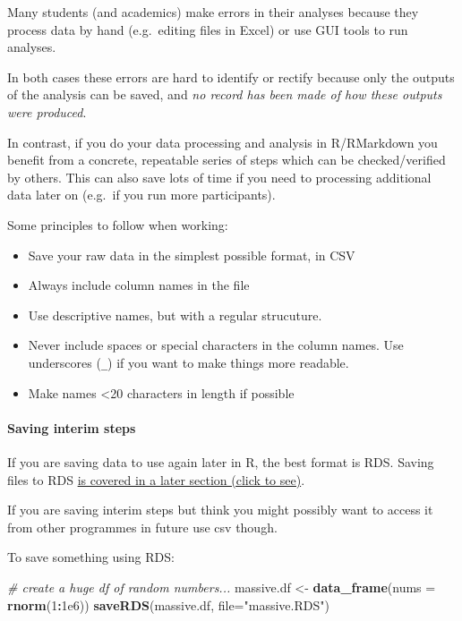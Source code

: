 \documentclass[]{article}
\newenvironment{Shaded}{\begin{snugshade}}{\end{snugshade}}
\newcommand{\KeywordTok}[1]{\textcolor[rgb]{0.13,0.29,0.53}{\textbf{#1}}}
\newcommand{\DataTypeTok}[1]{\textcolor[rgb]{0.13,0.29,0.53}{#1}}
\newcommand{\DecValTok}[1]{\textcolor[rgb]{0.00,0.00,0.81}{#1}}
\newcommand{\FloatTok}[1]{\textcolor[rgb]{0.00,0.00,0.81}{#1}}
\newcommand{\StringTok}[1]{\textcolor[rgb]{0.31,0.60,0.02}{#1}}
\newcommand{\CommentTok}[1]{\textcolor[rgb]{0.56,0.35,0.01}{\textit{#1}}}
\newcommand{\OperatorTok}[1]{\textcolor[rgb]{0.81,0.36,0.00}{\textbf{#1}}}
\newcommand{\NormalTok}[1]{#1}
\let\oldparagraph\paragraph
\renewcommand{\paragraph}[1]{\oldparagraph{#1}\mbox{}}
\theoremstyle{definition}
\theoremstyle{definition}
\theoremstyle{definition}
\theoremstyle{remark}
\begin{document}
Many students (and academics) make errors in their analyses because they
process data by hand (e.g.~editing files in Excel) or use GUI tools to
run analyses.

In both cases these errors are hard to identify or rectify because only
the outputs of the analysis can be saved, and \emph{no record has been
made of how these outputs were produced}.

In contrast, if you do your data processing and analysis in R/RMarkdown
you benefit from a concrete, repeatable series of steps which can be
checked/verified by others. This can also save lots of time if you need
to processing additional data later on (e.g.~if you run more
participants).

Some principles to follow when working:

\begin{itemize}
\item
  Save your raw data in the simplest possible format, in CSV
\item
  Always include column names in the file
\item
  Use descriptive names, but with a regular strucuture.
\item
  Never include spaces or special characters in the column names. Use
  underscores (\texttt{\_}) if you want to make things more readable.
\item
  Make names \textless{}20 characters in length if possible
\end{itemize}

\paragraph{Saving interim steps}\label{saving-interim-steps}

If you are saving data to use again later in R, the best format is RDS.
Saving files to RDS \protect\hyperlink{rds-files}{is covered in a later
section (click to see)}.

If you are saving interim steps but think you might possibly want to
access it from other programmes in future use csv though.

To save something using RDS:

\begin{Shaded}
\begin{Highlighting}[]
\CommentTok{# create a huge df of random numbers... }
\NormalTok{massive.df <-}\StringTok{ }\KeywordTok{data_frame}\NormalTok{(}\DataTypeTok{nums =} \KeywordTok{rnorm}\NormalTok{(}\DecValTok{1}\OperatorTok{:}\FloatTok{1e6}\NormalTok{))}
\KeywordTok{saveRDS}\NormalTok{(massive.df, }\DataTypeTok{file=}\StringTok{"massive.RDS"}\NormalTok{)}
\end{Highlighting}
\end{Shaded}
\end{document}
